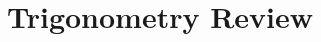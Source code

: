 \documentclass[../gatm_answers.tex]{subfiles}
\begin{document}
\section{Trigonometry Review}
\end{document}
